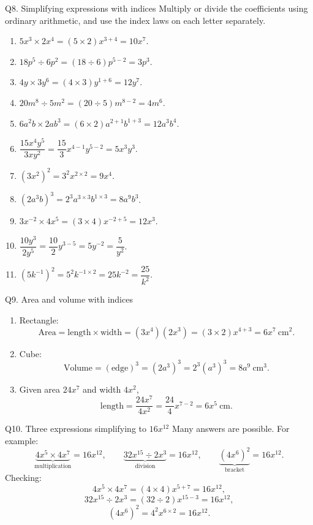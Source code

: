 \documentclass[12pt,a4paper]{article}
\begin{document}
\begin{solution}{Q8. Simplifying expressions with indices}
Multiply or divide the coefficients using ordinary arithmetic, and use the index laws on each letter separately.
\begin{enumerate}[label=\textbf{(\alph*)}]
\item \(5x^3\times2x^4=(5\times2)x^{3+4}=10x^7\).
\item \(18p^5\div6p^2=(18\div6)p^{5-2}=3p^3\).
\item \(4y\times3y^6=(4\times3)y^{1+6}=12y^7\).
\item \(20m^8\div5m^2=(20\div5)m^{8-2}=4m^6\).
\item \(6a^2b\times2ab^3=(6\times2)a^{2+1}b^{1+3}=12a^3b^4\).
\item \(\dfrac{15x^4y^5}{3xy^2}=\dfrac{15}{3}x^{4-1}y^{5-2}=5x^3y^3\).
\item \((3x^2)^2=3^2x^{2\times2}=9x^4\).
\item \((2a^3b)^3=2^3a^{3\times3}b^{1\times3}=8a^9b^3\).
\item \(3x^{-2}\times4x^5=(3\times4)x^{-2+5}=12x^3\).
\item \(\dfrac{10y^3}{2y^5}=\dfrac{10}{2}y^{3-5}=5y^{-2}=\dfrac{5}{y^2}\).
\item \((5k^{-1})^2=5^2k^{-1\times2}=25k^{-2}=\dfrac{25}{k^2}\).
\end{enumerate}
\end{solution}

\begin{solution}{Q9. Area and volume with indices}
\begin{enumerate}[label=\textbf{(\alph*)}]
\item Rectangle:
\[
\text{Area}=\text{length}\times\text{width}=(3x^4)(2x^3)
=(3\times2)x^{4+3}=6x^7\ \text{cm}^2.
\]
\item Cube:
\[
\text{Volume}=(\text{edge})^3=(2a^3)^3
=2^3(a^3)^3=8a^9\ \text{cm}^3.
\]
\item Given area \(24x^7\) and width \(4x^2\),
\[
\text{length}=\dfrac{24x^7}{4x^2}
=\dfrac{24}{4}x^{7-2}=6x^5\ \text{cm}.
\]
\end{enumerate}
\end{solution}

\begin{solution}{Q10. Three expressions simplifying to \(16x^{12}\)}
Many answers are possible. For example:
\[
\underbrace{4x^5\times4x^7}_{\text{multiplication}}=16x^{12},\qquad
\underbrace{32x^{15}\div2x^3}_{\text{division}}=16x^{12},\qquad
\underbrace{(4x^6)^2}_{\text{bracket}}=16x^{12}.
\]
Checking:
\[
4x^5\times4x^7=(4\times4)x^{5+7}=16x^{12},
\]
\[
32x^{15}\div2x^3=(32\div2)x^{15-3}=16x^{12},
\]
\[
(4x^6)^2=4^2x^{6\times2}=16x^{12}.
\]
\end{solution}
\end{document}
